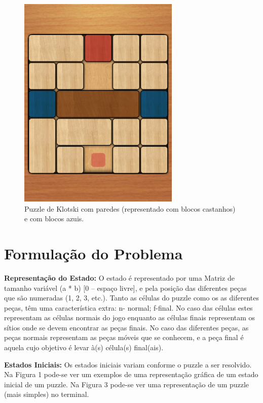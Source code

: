 \documentclass[conference]{IEEEtran}
\begin{document}
\begin{figure}
	\centering
	\includegraphics[width=0.75\linewidth]{klotski2.png}
	\caption{Puzzle de Klotski com paredes (representado com blocos castanhos) e com blocos azuis.}
	\label{fig:klotski2}
\end{figure}



\section{Formulação do Problema}
\textbf{Representação do Estado:} O estado é representado por uma Matriz de tamanho variável (a * b) [0 – espaço livre], e pela posição das diferentes peças que são numeradas (1, 2, 3, etc.). 
Tanto as células do puzzle como os as diferentes peças, têm uma característica extra: n- normal; f-final. No caso das células estes representam as células normais do jogo enquanto as células finais representam os sítios onde se devem encontrar as peças finais. No caso das diferentes peças, as peças normais representam as peças móveis que se conhecem, e a peça final é aquela cujo objetivo é levar à(s) célula(s) final(ais).

\textbf{Estados Iniciais:} Os estados iniciais variam conforme o puzzle a ser resolvido. Na Figura 1 pode-se ver um exemplos de uma representação gráfica de um estado inicial de um puzzle. Na Figura 3 pode-se ver uma representação de um puzzle (mais simples) no terminal.
\end{document}

